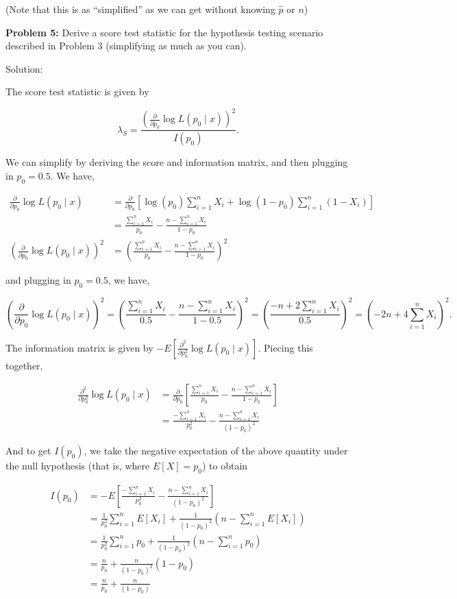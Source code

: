 \documentclass[
  letterpaper,
  DIV=11,
  numbers=noendperiod]{scrreprt}
\begin{document}
(Note that this is as ``simplified'' as we can get without knowing
\(\hat{p}\) or \(n\))

\textbf{Problem 5:} Derive a score test statistic for the hypothesis
testing scenario described in Problem 3 (simplifying as much as you
can).

Solution:

The score test statistic is given by

\[
\lambda_S = \frac{\left( \frac{\partial}{\partial p_0} \log L(p_0 \mid x) \right)^2}{I(p_0)}.
\]

We can simplify by deriving the score and information matrix, and then
plugging in \(p_0 = 0.5\). We have,

\begin{align*}
\frac{\partial}{\partial p_0} \log L(p_0 \mid x) & = \frac{\partial}{\partial p_0} \left[ \log(p_0) \sum_{i = 1}^n X_i + \log(1 - p_0) \sum_{i = 1}^n (1 - X_i) \right] \\
& = \frac{\sum_{i = 1}^n X_i}{p_0} - \frac{n - \sum_{i = 1}^n  X_i}{1 - p_0} \\
\left( \frac{\partial}{\partial p_0} \log L(p_0 \mid x) \right)^2 & = \left(\frac{\sum_{i = 1}^n X_i}{p_0} - \frac{n - \sum_{i = 1}^n  X_i}{1 - p_0} \right)^2
\end{align*}

and plugging in \(p_0 = 0.5\), we have,

\[
\left( \frac{\partial}{\partial p_0} \log L(p_0 \mid x)\right)^2 = \left(\frac{\sum_{i = 1}^n X_i}{0.5} - \frac{n - \sum_{i = 1}^n  X_i}{1 - 0.5} \right)^2 = \left( \frac{-n + 2\sum_{i = 1}^n X_i}{0.5}\right)^2 = \left( -2n + 4\sum_{i = 1}^n X_i\right)^2.
\]

The information matrix is given by
\(-E\left[ \frac{\partial^2}{\partial p_0^2} \log L(p_0 \mid x)\right]\).
Piecing this together,

\begin{align*}
 \frac{\partial^2}{\partial p_0^2} \log L(p_0 \mid x) 
& =  \frac{\partial}{\partial p_0} \left[ \frac{\sum_{i = 1}^n X_i}{p_0} - \frac{n - \sum_{i = 1}^n  X_i}{1 - p_0} \right] \\
& = \frac{-\sum_{i = 1}^n X_i}{p_0^2} - \frac{n - \sum_{i = 1}^n  X_i}{(1 - p_0)^2} 
\end{align*}

And to get \(I(p_0)\), we take the negative expectation of the above
quantity under the null hypothesis (that is, where \(E[X] = p_0\)) to
obtain

\begin{align*}
    I(p_0) & = -E \left[ \frac{-\sum_{i = 1}^n X_i}{p_0^2} - \frac{n - \sum_{i = 1}^n  X_i}{(1 - p_0)^2} \right] \\
    & = \frac{1}{p_0^2} \sum_{i = 1}^n E[X_i] + \frac{1}{(1 - p_0)^2} \left( n - \sum_{i = 1}^n E[X_i]\right) \\
    & = \frac{1}{p_0^2} \sum_{i = 1}^n p_0 + \frac{1}{(1 - p_0)^2} \left( n - \sum_{i = 1}^n p_0\right) \\
    & = \frac{n}{p_0}  + \frac{n}{(1 - p_0)^2} \left( 1 - p_0\right) \\
    & = \frac{n}{p_0}  + \frac{n}{(1 - p_0)}
\end{align*}
\end{document}
